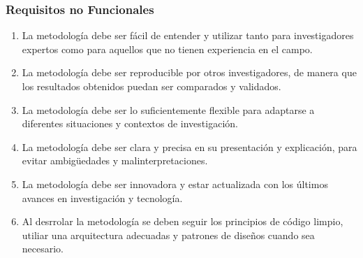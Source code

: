 \subsubsection{Requisitos no Funcionales}
\begin{enumerate}
    \renewcommand{\labelenumi}{RNF\arabic{enumi}}
    \item La metodología debe ser fácil de entender y utilizar tanto para 
    investigadores expertos como para aquellos que no tienen experiencia en el campo.
    \item La metodología debe ser reproducible por otros investigadores, de manera 
    que los resultados obtenidos puedan ser comparados y validados.
    \item La metodología debe ser lo suficientemente flexible para adaptarse a 
    diferentes situaciones y contextos de investigación.
    \item La metodología debe ser clara y precisa en su presentación y explicación, 
    para evitar ambigüedades y malinterpretaciones.
    \item La metodología debe ser innovadora y estar actualizada con los últimos 
    avances en investigación y tecnología. 
    \item Al desrrolar la metodología se deben seguir los principios de código limpio, 
    utiliar una arquitectura adecuadas y patrones de diseños cuando sea necesario.
\end{enumerate}